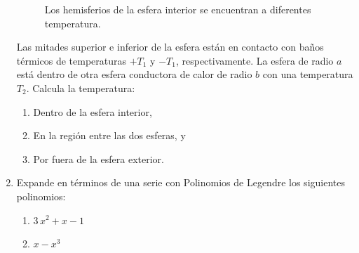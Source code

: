 \begin{enumerate}
\begin{figure}[H]
    \caption{Los hemisferios de la esfera interior se encuentran a diferentes temperatura.}
    \label{fig:figura2}
\end{figure}
Las mitades superior e inferior de la esfera están en contacto con baños térmicos de temperaturas $+ T_{1}$ y $-T_{1}$, respectivamente. La esfera de radio $a$ está dentro de otra esfera conductora de calor de radio $b$ con una temperatura $T_{2}$.
Calcula la temperatura:
\begin{enumerate}[label=\roman*)]
\item Dentro de la esfera interior,
\item En la región entre las dos esferas, y
\item Por fuera de la esfera exterior.
\end{enumerate}
\item Expande en términos de una serie con Polinomios de Legendre los siguientes polinomios:
\begin{enumerate}[label=\alph*)]
\item $3 \, x^{2} + x - 1$
\item $x - x^{3}$
\end{enumerate}
\end{enumerate}
